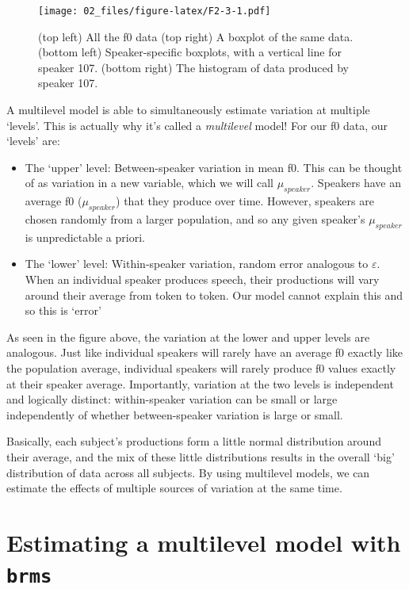 \documentclass[
]{book}
\begin{document}
\begin{figure}
\centering
\texttt{[image: 02\_files/figure-latex/F2-3-1.pdf]}
\caption{\label{fig:F2-3}(top left) All the f0 data (top right) A boxplot of the same data. (bottom left) Speaker-specific boxplots, with a vertical line for speaker 107. (bottom right) The histogram of data produced by speaker 107.}
\end{figure}

A multilevel model is able to simultaneously estimate variation at multiple `levels'. This is actually why it's called a \emph{multilevel} model! For our f0 data, our `levels' are:

\begin{itemize}
\item
  The `upper' level: Between-speaker variation in mean f0. This can be thought of as variation in a new variable, which we will call \(\mu_{speaker}\). Speakers have an average f0 (\(\mu_{speaker}\)) that they produce over time. However, speakers are chosen randomly from a larger population, and so any given speaker's \(\mu_{speaker}\) is unpredictable a priori.
\item
  The `lower' level: Within-speaker variation, random error analogous to \(\varepsilon\). When an individual speaker produces speech, their productions will vary around their average from token to token. Our model cannot explain this and so this is `error'
\end{itemize}

As seen in the figure above, the variation at the lower and upper levels are analogous. Just like individual speakers will rarely have an average f0 exactly like the population average, individual speakers will rarely produce f0 values exactly at their speaker average. Importantly, variation at the two levels is independent and logically distinct: within-speaker variation can be small or large independently of whether between-speaker variation is large or small.

Basically, each subject's productions form a little normal distribution around their average, and the mix of these little distributions results in the overall `big' distribution of data across all subjects. By using multilevel models, we can estimate the effects of multiple sources of variation at the same time.

\hypertarget{estimating-a-multilevel-model-with-brms}{%
\section{\texorpdfstring{Estimating a multilevel model with \texttt{brms}}{Estimating a multilevel model with brms}}\label{estimating-a-multilevel-model-with-brms}}
\end{document}
